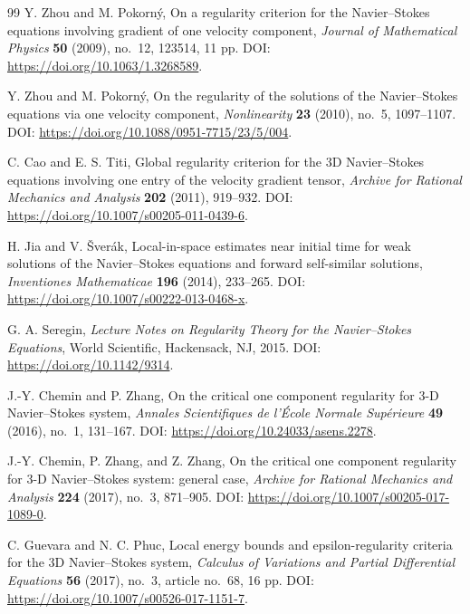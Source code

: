 \documentclass[11pt]{article}
\numberwithin{equation}{section}
\begin{document}
\begin{thebibliography}{99}
	Y. Zhou and M. Pokorn\'y,
	On a regularity criterion for the Navier--Stokes equations involving gradient of one velocity component,
	\newblock \emph{Journal of Mathematical Physics} \textbf{50} (2009), no.~12, 123514, 11 pp.
	\newblock DOI: \url{https://doi.org/10.1063/1.3268589}.


	Y. Zhou and M. Pokorn\'y,
	On the regularity of the solutions of the Navier--Stokes equations via one velocity component,
	\newblock \emph{Nonlinearity} \textbf{23} (2010), no.~5, 1097--1107.
	\newblock DOI: \url{https://doi.org/10.1088/0951-7715/23/5/004}.

	C. Cao and E. S. Titi,
	Global regularity criterion for the 3D Navier--Stokes equations involving one entry of the velocity gradient tensor,
	\newblock \emph{Archive for Rational Mechanics and Analysis} \textbf{202} (2011), 919--932.
	\newblock DOI: \url{https://doi.org/10.1007/s00205-011-0439-6}.

	H. Jia and V. \v{S}ver\'ak,
	Local-in-space estimates near initial time for weak solutions of the Navier--Stokes equations and forward self-similar solutions,
	\newblock \emph{Inventiones Mathematicae} \textbf{196} (2014), 233--265.
	\newblock DOI: \url{https://doi.org/10.1007/s00222-013-0468-x}.

	G. A. Seregin,
	\emph{Lecture Notes on Regularity Theory for the Navier--Stokes Equations},
	World Scientific, Hackensack, NJ, 2015.
	\newblock DOI: \url{https://doi.org/10.1142/9314}.

	J.-Y. Chemin and P. Zhang,
	On the critical one component regularity for 3-D Navier--Stokes system,
	\newblock \emph{Annales Scientifiques de l'\'Ecole Normale Sup\'erieure} \textbf{49} (2016), no.~1, 131--167.
	\newblock DOI: \url{https://doi.org/10.24033/asens.2278}.

	J.-Y. Chemin, P. Zhang, and Z. Zhang,
	On the critical one component regularity for 3-D Navier--Stokes system: general case,
	\newblock \emph{Archive for Rational Mechanics and Analysis} \textbf{224} (2017), no.~3, 871--905.
	\newblock DOI: \url{https://doi.org/10.1007/s00205-017-1089-0}.

	C. Guevara and N. C. Phuc,
	Local energy bounds and epsilon-regularity criteria for the 3D Navier--Stokes system,
	\newblock \emph{Calculus of Variations and Partial Differential Equations} \textbf{56} (2017), no.~3, article no.~68, 16 pp.
	\newblock DOI: \url{https://doi.org/10.1007/s00526-017-1151-7}.


\end{thebibliography}
\end{document}

